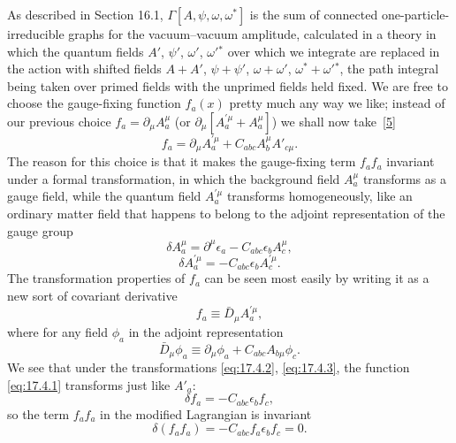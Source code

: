 As described in Section 16.1, $\Gamma[A,\psi,\omega,\omega^*]$ is the sum of
connected one-particle-irreducible graphs for the vacuum--vacuum amplitude,
calculated in a theory in which the quantum fields
$A'$, $\psi'$, $\omega'$, $\omega'{}^*$ over which we integrate are replaced
in the action with shifted fields $A+A'$, $\psi+\psi'$, $\omega+\omega'$,
$\omega^*+\omega'{}^*$, the path integral being taken over primed fields
with the unprimed fields held fixed. We are free to choose the gauge-fixing
function $f_a(x)$ pretty much any way we like; instead of our previous
choice $f_a=\partial_\mu A_a^\mu$ (or
$\partial_\mu[A_a^{\prime\mu}+A_a^\mu]$) we shall now
take~\hyperref[ch17-ref-5]{[5]}
\begin{equation}
f_a=\partial_\mu A_a^{\prime\mu}
+C_{abc}A_b^\mu A'_{c\mu}.
\label{eq:17.4.1}
\end{equation}
The reason for this choice is that it makes the gauge-fixing term
$f_a f_a$ invariant under a formal transformation, in which the
background field $A_a^\mu$ transforms as a gauge field, while the
quantum field $A_a^{\prime\mu}$ transforms homogeneously, like an
ordinary matter field that happens to belong to the adjoint representation
of the gauge group
\begin{equation}
\delta A_a^\mu=\partial^\mu\epsilon_a
-C_{abc}\epsilon_b A_c^\mu,
\label{eq:17.4.2}
\end{equation}
\begin{equation}
\delta A_a^{\prime\mu}
=-C_{abc}\epsilon_b A_c^{\prime\mu}.
\label{eq:17.4.3}
\end{equation}
The transformation properties of $f_a$ can be seen most easily by
writing it as a new sort of covariant derivative
\begin{equation}
f_a\equiv\bar D_\mu A_a^{\prime\mu},
\label{eq:17.4.4}
\end{equation}
where for any field $\phi_a$ in the adjoint representation
\begin{equation}
\bar D_\mu\phi_a\equiv
\partial_\mu\phi_a+C_{abc}A_{b\mu}\phi_c.
\label{eq:17.4.5}
\end{equation}
We see that under the transformations \eqref{eq:17.4.2},
\eqref{eq:17.4.3}, the function \eqref{eq:17.4.1} transforms just like
$A'_a$:
\begin{equation}
\delta f_a=-C_{abc}\epsilon_b f_c,
\label{eq:17.4.6}
\end{equation}
so the term $f_a f_a$ in the modified Lagrangian is invariant
\begin{equation}
\delta(f_a f_a)
=-C_{abc}f_a\epsilon_b f_c=0.
\label{eq:17.4.7}
\end{equation}
